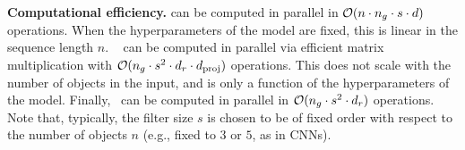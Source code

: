 \textbf{Computational efficiency.}  can be computed in parallel in ${\mathcal{O}}(n \cdot n_g \cdot s \cdot d)$ operations. When the hyperparameters of the model are fixed, this is linear in the sequence length $n$. ~ can be computed in parallel via efficient matrix multiplication with ${\mathcal{O}}(n_g \cdot s^2 \cdot d_r \cdot d_{\mathrm{proj}})$ operations. This does not scale with the number of objects in the input, and is only a function of the hyperparameters of the model. Finally,~ can be computed in parallel in ${\mathcal{O}}(n_g \cdot s^2 \cdot d_r)$ operations. Note that, typically, the filter size $s$ is chosen to be of fixed order with respect to the number of objects $n$ (e.g., fixed to $3$ or $5$, as in CNNs).